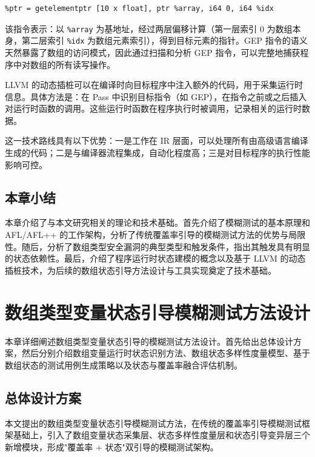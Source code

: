 \documentclass[bachelor]{njupthesis}
\begin{document}
\begin{verbatim}
%ptr = getelementptr [10 x float], ptr %array, i64 0, i64 %idx
\end{verbatim}

该指令表示：以 \texttt{\%array} 为基地址，经过两层偏移计算（第一层索引 0 为数组本身，第二层索引 \texttt{\%idx} 为数组元素索引），得到目标元素的指针。GEP 指令的语义天然暴露了数组的访问模式，因此通过扫描和分析 GEP 指令，可以完整地捕获程序中对数组的所有读写操作。

LLVM 的动态插桩可以在编译时向目标程序中注入额外的代码，用于采集运行时信息。具体方法是：在 Pass 中识别目标指令（如 GEP），在指令之前或之后插入对运行时函数的调用。这些运行时函数在程序执行时被调用，记录相关的运行时数据。

这一技术路线具有以下优势：一是工作在 IR 层面，可以处理所有由高级语言编译生成的代码；二是与编译器流程集成，自动化程度高；三是对目标程序的执行性能影响可控。

\section{本章小结}

本章介绍了与本文研究相关的理论和技术基础。首先介绍了模糊测试的基本原理和 AFL/AFL++ 的工作架构，分析了传统覆盖率引导的模糊测试方法的优势与局限性。随后，分析了数组类型安全漏洞的典型类型和触发条件，指出其触发具有明显的状态依赖性。最后，介绍了程序运行时状态建模的概念以及基于 LLVM 的动态插桩技术，为后续的数组状态引导方法设计与工具实现奠定了技术基础。

\chapter{数组类型变量状态引导模糊测试方法设计}

本章详细阐述数组类型变量状态引导的模糊测试方法设计。首先给出总体设计方案，然后分别介绍数组变量运行时状态识别方法、数组状态多样性度量模型、基于数组状态的测试用例生成策略以及状态与覆盖率融合评估机制。

\section{总体设计方案}

本文提出的数组类型变量状态引导模糊测试方法，在传统的覆盖率引导模糊测试框架基础上，引入了数组变量状态采集层、状态多样性度量层和状态引导变异层三个新增模块，形成"覆盖率 + 状态"双引导的模糊测试架构。
\end{document}
